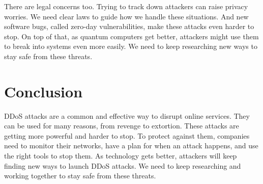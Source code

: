 \documentclass[a4paper, 12pt]{report} %
\begin{document}
                    There are legal concerns too. Trying to track down attackers can raise privacy worries. We need clear laws to guide how we handle these situations. And new software bugs, called zero-day vulnerabilities, make these attacks even harder to stop. On top of that, as quantum computers get better, attackers might use them to break into systems even more easily. We need to keep researching new ways to stay safe from these threats.


                    \section{Conclusion}
                    DDoS attacks are a common and effective way to disrupt online services. They can be used for many reasons, from revenge to extortion. These attacks are getting more powerful and harder to stop. To protect against them, companies need to monitor their networks, have a plan for when an attack happens, and use the right tools to stop them. As technology gets better, attackers will keep finding new ways to launch DDoS attacks. We need to keep researching and working together to stay safe from these threats.



            

       \printbibliography
    
\end{document}
